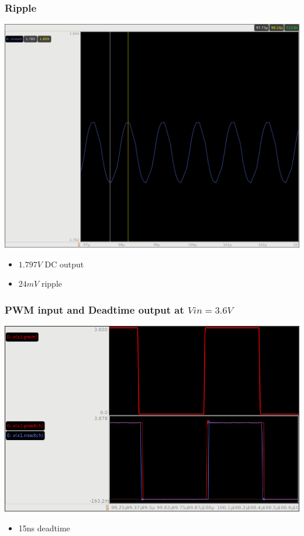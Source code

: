 \documentclass{beamer}
\begin{document}
\begin{frame}
  \frametitle{Ripple}
  \includegraphics[scale=0.25]{ripple.png}
  \begin{itemize}
  \item $1.797 V$ DC output
  \item $24 mV$ ripple
  \end{itemize}
\end{frame}

\begin{frame}
  \frametitle{PWM input and Deadtime output at $Vin = 3.6V$}
  \includegraphics[scale=0.25]{pwm-deadtime.png}
  \begin{itemize}
  \item 15ns deadtime 
  \end{itemize}
\end{frame}
\end{document}
